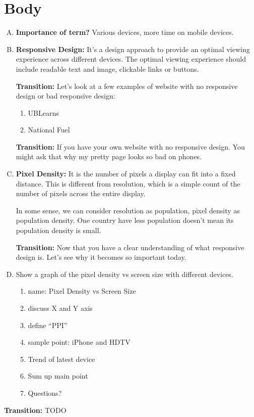 \documentclass{article}
\begin{document}
\section{Body}
\begin{enumerate}[A.]
\item \textbf{Importance of term?} Various devices, more time on mobile devices.
\item \textbf{Responsive Design:} It’s a design approach to provide an optimal viewing experience
  across different devices.
  The optimal viewing experience should include readable text and image, clickable links or buttons.

  \textbf{Transition:} Let’s look at a few examples of website with no responsive design or bad responsive design:
  \begin{enumerate}[1.]
  \item UBLearns
  \item National Fuel
  \end{enumerate}

\textbf{Transition:} If you have your own website with no responsive design.
You might ask that why my pretty page looks so bad on phones.
\item \textbf{Pixel Density:} It is the number of pixels a display can fit into a fixed distance.
This is different from resolution, which is a simple count of the number of pixels across the entire display.

In some sense, we can consider resolution as population, pixel density as population density.
One country have less population doesn't mean its population density is small.

\textbf{Transition:} Now that you have a clear understanding of what responsive design is.
Let's see why it becomes so important today.
\item Show a graph of the pixel density vs screen size with different devices.
  \begin{enumerate}[1.]
  \item name: Pixel Density vs Screen Size
  \item discuss X and Y axis
  \item define ``PPI''
  \item sample point: iPhone and HDTV
  \item Trend of latest device
  \item Sum up main point
  \item Questions?
  \end{enumerate}

\end{enumerate}
\textbf{Transition:} TODO
\end{document}
